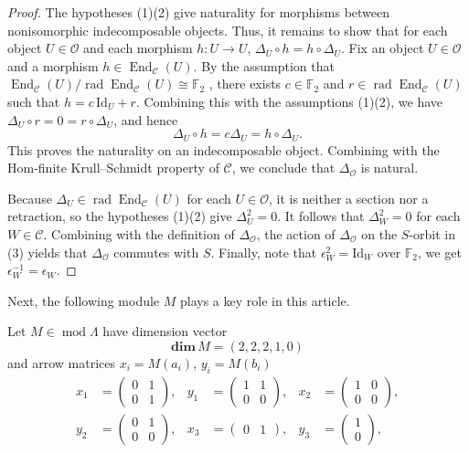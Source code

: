 \documentclass[a4paper,reqno,10pt]{amsart}
\numberwithin{equation}{section}
\DeclareMathOperator{\modu}{mod}
\DeclareMathOperator{\End}{End}
\newcommand{\kk}{\mathbb F_2}
\newcommand{\cO}{\mathcal O}
\newcommand{\eps}{\epsilon}
\begin{document}
\begin{proof}
The hypotheses (1)(2) give naturality for morphisms between
nonisomorphic indecomposable objects. Thus, it remains to show that for each object $U\in \cO$ and each morphism $h\colon U\to U$, $\Delta_U\circ h=h\circ \Delta_U$.  Fix an object $U\in\cO$ and a morphism $h\in\End_{\mathcal C}(U)$. By the assumption that $\End_{\mathcal C}(U)/\operatorname{rad}\End_{\mathcal C}(U)\cong\kk$
 , there exists $c\in\mathbb F_2$ and $r\in\operatorname{rad}\End_{\mathcal C}(U)$ such that 
$
 h=c\,\mathrm{Id}_U+r.
$
Combining this with the assumptions (1)(2), we have
$\Delta_U\circ r=0=r\circ\Delta_U$, and hence
$$
\Delta_U\circ h=c\Delta_U=h\circ\Delta_U. $$
This proves the naturality on an
indecomposable object. Combining with the
Hom-finite Krull--Schmidt property of $\mathcal C$, we conclude that $\Delta_{\cO}$ is natural.


Because $\Delta_U\in \operatorname{rad}\End_{\mathcal C}(U)$ for each $U\in\cO$, it is neither a section nor a retraction, so
the hypotheses (1)(2) give $\Delta_U^2=0$. It follows that $\Delta_W^2=0$ for each $W\in\mathcal C$.  Combining with the definition of $\Delta_{\cO}$,  the action of $\Delta_{\cO}$ on the $S$-orbit in (3) yields that $\Delta_{\cO}$ commutes with
$S$. Finally,  note that
$\eps_{W}^2=\mathrm{Id}_W$ over $\kk$, we get $\eps_{W}^{-1}=\eps_{W}$.
\end{proof}

Next, the following module $M$ plays a key role in this article. 

\begin{definition}\label{def:module-M}
Let $M\in \modu\Lambda$ have dimension vector
\[
 \mathbf{dim}\,M=(2,2,2,1,0)
\]
and arrow matrices $x_i=M(a_i)$, $y_i=M(b_i)$
\[
\begin{aligned}
x_1&=\begin{pmatrix}0&1\\0&1\end{pmatrix},&
y_1&=\begin{pmatrix}1&1\\0&0\end{pmatrix},&
x_2&=\begin{pmatrix}1&0\\0&0\end{pmatrix},\\
y_2&=\begin{pmatrix}0&1\\0&0\end{pmatrix},&
x_3&=\begin{pmatrix}0&1\end{pmatrix},&
y_3&=\begin{pmatrix}1\\0\end{pmatrix},
\end{aligned}
\]
\end{definition}
\end{document}
